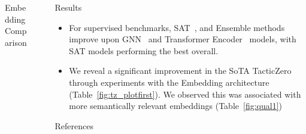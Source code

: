 \documentclass[final]{beamer}
\newlength{\sepwid}
\newlength{\onecolwid}
\newlength{\twocolwid}
\begin{document}
\begin{frame}[t]
\begin{columns}[t]
\begin{column}{\twocolwid}
\begin{block}{Embedding Comparison}
                \end{block}{}


            \end{column} %

            \begin{column}{\sepwid}\end{column} %

            \begin{column}{\onecolwid} %


                \begin{alertblock}{Results}
                    \begin{itemize}
                        \item For supervised benchmarks, SAT~\cite{chen_structure-aware_2022, luo_transformers_2023},
                        and Ensemble methods improve upon GNN~\cite{wang_premise_2017} and Transformer Encoder~\cite{vaswani_attention_2017} models,
                        with SAT models performing the best overall.
                        \item  We reveal a significant improvement in the SoTA TacticZero~\cite{wu_tacticzero_2021}
                        through experiments with the Embedding architecture (Table~\ref{fig:tz_plotfirst}).
                        We observed this was associated with more semantically relevant embeddings (Table~\ref{fig:qual1})
                    \end{itemize}
                \end{alertblock}



                \begin{block}{References}
                    \small{
                    \vspace{0.75in}}



\end{block}
\end{column}
\end{columns}
\end{frame}
\end{document}
